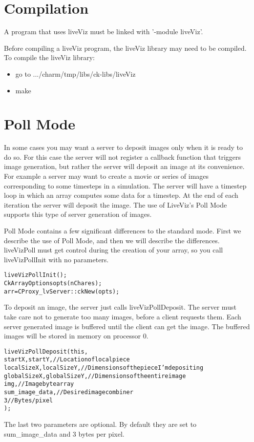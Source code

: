 \section{Compilation}

A \charmpp{} program that uses liveViz must be linked with '-module liveViz'. 

Before compiling a liveViz program, the liveViz library may need to be compiled. 
To compile the liveViz library:
\begin{itemize}
\item go to .../charm/tmp/libs/ck-libs/liveViz
\item make
\end{itemize}


\section{Poll Mode}

In some cases you may want a server to deposit images only when it is ready to do so. 
For this case the server will not register a callback function that triggers image generation, but rather the server will deposit an image at its convenience.
For example a server may want to create a movie or series of images corresponding to some
timesteps in a simulation. The server will have a timestep loop in which an array computes 
some data for a timestep. At the end of each iteration the server will deposit the image. The use of LiveViz's Poll Mode supports this type of server generation of images.

Poll Mode contains a few significant differences to the standard mode. First we describe the use of Poll Mode, and then we will describe the differences. liveVizPoll must get control during the creation of your array,
so you call liveVizPollInit with no parameters.

\begin{alltt}
	liveVizPollInit();
	CkArrayOptions opts(nChares);
	arr = CProxy_lvServer::ckNew(opts);
\end{alltt}

To deposit an image, the server just calls liveVizPollDeposit. The server must take care not to generate too many images, before a client requests them. Each server generated image is buffered until the client can get the image. The buffered images will be stored in memory on processor 0.

\begin{alltt}
  liveVizPollDeposit( this,
                      startX,startY,            // Location of local piece
                      localSizeX,localSizeY,    // Dimensions of the piece I'm depositing
                      globalSizeX,globalSizeY,  // Dimensions of the entire image
                      img,                      // Image byte array
                      sum_image_data,           // Desired image combiner
                      3                         // Bytes/pixel
                    );
\end{alltt}
The last two parameters are optional. By default they are set to sum\_image\_data and 3 bytes per pixel.



